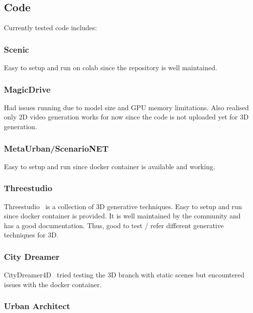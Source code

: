 \documentclass{article}
\begin{document}

\subsection{Code}

Currently tested code includes:

\subsubsection{Scenic}

Easy to setup and run on colab since the repository is well maintained.

\subsubsection{MagicDrive}

Had issues running due to model size and GPU memory limitations. Also realised only 2D video generation works for now since the code is not uploaded yet for 3D generation.

\subsubsection{MetaUrban/ScenarioNET}

Easy to setup and run since docker container is available and working.

\subsubsection{Threestudio}

Threestudio~\cite{liu2023threestudio} is a collection of 3D generative techniques. Easy to setup and run since docker container is provided. It is well maintained by the community and has a good documentation. Thus, good to test / refer different generative techniques for 3D.

\subsubsection{City Dreamer}

CityDreamer4D~\cite{xie2025citydreamer4d} tried testing the 3D branch with static scenes but encountered issues with the docker container.

\subsubsection{Urban Architect}
\end{document}
